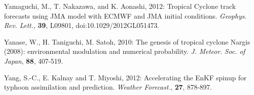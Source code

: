 \documentclass[a4paper, 12pt]{article}
\begin{document}
{\begin{list}{}{\leftmargin=1em \itemindent=-2em}
    \item Yamaguchi, M., T. Nakazawa, and K. Aonashi, 2012:  Tropical Cyclone track forecasts using JMA model with ECMWF and JMA initial conditions. \emph{Geophys. Rev. Lett.,} {\bf 39}, L09801, doi:10.1029/2012GL051473.

\item Yanase, W., H. Taniguchi, M. Satoh, 2010: The genesis of tropical cyclone Nargis (2008): environmental modulation and numerical probability. \emph{J. Meteor. Soc. of Japan}, {\bf 88}, 407-519.

        \item Yang, S.-C., E. Kalnay and T. Miyoshi, 2012: Accelerating the EnKF spinup for typhoon assimilation and prediction. \emph{Weather Forecast.}, {\bf 27}, 878-897.



\end{list}

\newpage

}
\end{document}
